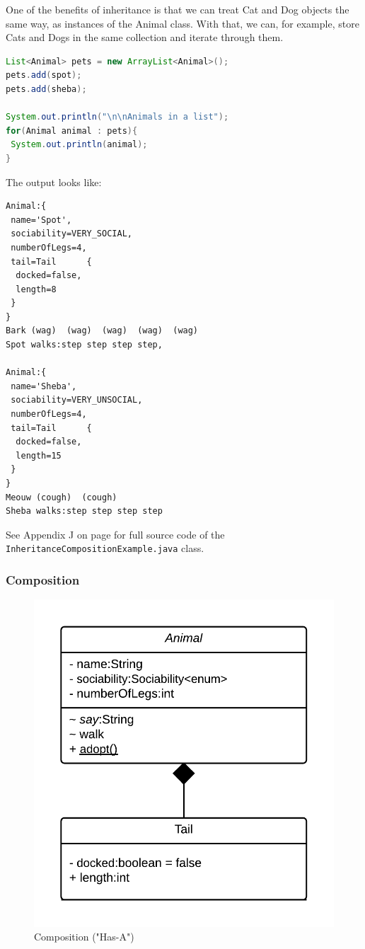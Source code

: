 One of the benefits of inheritance is that we can treat Cat and Dog objects the same way, as instances of the Animal class. With that, we can, for example, store Cats and Dogs in the same collection and iterate through them.
\begin{lstlisting}[language=Java]
List<Animal> pets = new ArrayList<Animal>();
pets.add(spot);
pets.add(sheba);

System.out.println("\n\nAnimals in a list");
for(Animal animal : pets){
 System.out.println(animal);
}
\end{lstlisting}

The output looks like:
\begin{lstlisting}
Animal:{  
 name='Spot',
 sociability=VERY_SOCIAL,
 numberOfLegs=4,
 tail=Tail      {  
  docked=false,
  length=8
 }
}
Bark (wag)  (wag)  (wag)  (wag)  (wag) 
Spot walks:step step step step,

Animal:{  
 name='Sheba',
 sociability=VERY_UNSOCIAL,
 numberOfLegs=4,
 tail=Tail      {  
  docked=false,
  length=15
 }
}
Meouw (cough)  (cough)
Sheba walks:step step step step
\end{lstlisting}

See Appendix J on page \pageref{App:AppendixJ} for full source code of the \texttt{InheritanceCompositionExample.java} class.

\subsubsection{Composition}
\begin{figure}[!h]\centering %
\includegraphics[width=0.9\linewidth, frame]{images/composition}
\caption{Composition ("Has-A")}
\label{fig:composition}
\end{figure}

